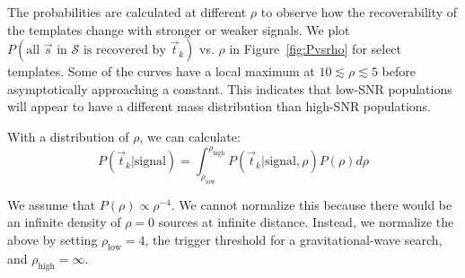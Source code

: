 \documentclass[twocolumn,showpacs,unsortedaddress,superscriptaddress,showkeys,nofootinbib,preprintnumbers,letterpaper]{revtex4-1}
\begin{document}
The probabilities are calculated at different $\rho$ to observe how the recoverability of the templates change with stronger or weaker signals. We plot $P(\text{all $\vec{s}$ in $\mathcal{S}$ is recovered by $\vec{t}_k$})$ vs. $\rho$ in Figure~\ref{fig:Pvsrho} for select templates. Some of the curves have a local maximum at $10\lesssim \rho\lesssim 5$ before asymptotically approaching a constant. This indicates that low-SNR populations will appear to have a different mass distribution than high-SNR populations.

With a distribution of $\rho$, we can calculate:
	\begin{equation}
	P(\vec{t}_k|\text{signal}) = \int_{\rho_{\text{low}}}^{\rho_{\text{high}}} P(\vec{t}_k|\text{signal},\rho) P(\rho) d\rho
	\end{equation}

We assume that $P(\rho)\propto\rho^{-4}$. We cannot normalize this because there would be an infinite density of $\rho=0$ sources at infinite distance. Instead, we normalize the above by setting $\rho_{\text{low}}=4$, the trigger threshold for a gravitational-wave search, and $\rho_{\text{high}}=\infty$.
\end{document}
